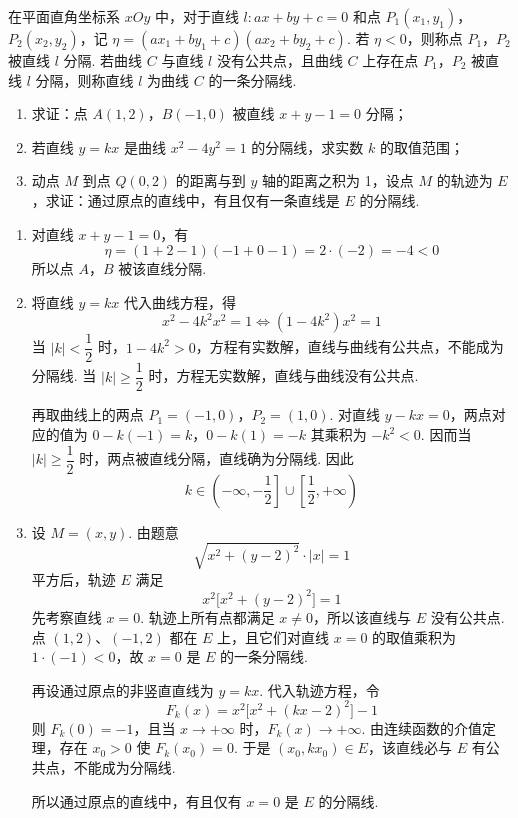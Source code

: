 \begin{problem}
在平面直角坐标系 \(xOy\) 中，对于直线 \(l: ax + by + c = 0\) 和点 \(P_{1}(x_{1}, y_{1})\)，\(P_{2}(x_{2}, y_{2})\)，记 \(\eta = (ax_{1} + by_{1} + c)(ax_{2} + by_{2} + c)\). 若 \(\eta < 0\)，则称点 \(P_{1}\)，\(P_{2}\) 被直线 \(l\) 分隔. 若曲线 \(C\) 与直线 \(l\) 没有公共点，且曲线 \(C\) 上存在点 \(P_{1}\)，\(P_{2}\) 被直线 \(l\) 分隔，则称直线 \(l\) 为曲线 \(C\) 的一条分隔线.

\begin{enumerate}
\item 求证：点 \(A(1,2)\)，\(B(-1,0)\) 被直线 \(x + y - 1 = 0\) 分隔；
\item 若直线 \(y = kx\) 是曲线 \(x^2 - 4y^2 = 1\) 的分隔线，求实数 \(k\) 的取值范围；
\item 动点 \(M\) 到点 \(Q(0,2)\) 的距离与到 \(y\) 轴的距离之积为 1，设点 \(M\) 的轨迹为 \(E\)，求证：通过原点的直线中，有且仅有一条直线是 \(E\) 的分隔线.
\end{enumerate}
\end{problem}

\begin{solution}
\begin{enumerate}
\item 对直线 \(x+y-1=0\)，有
\[
\eta=(1+2-1)(-1+0-1)=2\cdot(-2)=-4<0
\]
所以点 \(A\)，\(B\) 被该直线分隔.
\item 将直线 \(y=kx\) 代入曲线方程，得
\[
x^2-4k^2x^2=1
\iff (1-4k^2)x^2=1
\]
当 \(\lvert k\rvert<\dfrac12\) 时，\(1-4k^2>0\)，方程有实数解，直线与曲线有公共点，不能成为分隔线. 当 \(\lvert k\rvert\geqslant\dfrac12\) 时，方程无实数解，直线与曲线没有公共点.

再取曲线上的两点 \(P_1=(-1,0)\)，\(P_2=(1,0)\). 对直线 \(y-kx=0\)，两点对应的值为
\(0-k(-1)=k\)，\(0-k(1)=-k\)
其乘积为 \(-k^2<0\). 因而当 \(\lvert k\rvert\geqslant\dfrac12\) 时，两点被直线分隔，直线确为分隔线. 因此
\[
k\in\left(-\infty,-\frac12\right]\cup\left[\frac12,+\infty\right)
\]
\item 设 \(M=(x,y)\). 由题意
\[
\sqrt{x^2+(y-2)^2}\cdot\lvert x\rvert=1
\]
平方后，轨迹 \(E\) 满足
\[
x^2\bigl[x^2+(y-2)^2\bigr]=1
\]
先考察直线 \(x=0\). 轨迹上所有点都满足 \(x\neq0\)，所以该直线与 \(E\) 没有公共点. 点 \((1,2)\)、\((-1,2)\) 都在 \(E\) 上，且它们对直线 \(x=0\) 的取值乘积为 \(1\cdot(-1)<0\)，故 \(x=0\) 是 \(E\) 的一条分隔线.

再设通过原点的非竖直直线为 \(y=kx\). 代入轨迹方程，令
\[
F_k(x)=x^2\bigl[x^2+(kx-2)^2\bigr]-1
\]
则 \(F_k(0)=-1\)，且当 \(x\to+\infty\) 时，\(F_k(x)\to+\infty\). 由连续函数的介值定理，存在 \(x_0>0\) 使 \(F_k(x_0)=0\). 于是 \((x_0,kx_0)\in E\)，该直线必与 \(E\) 有公共点，不能成为分隔线.

所以通过原点的直线中，有且仅有 \(x=0\) 是 \(E\) 的分隔线.
\end{enumerate}
\end{solution}


